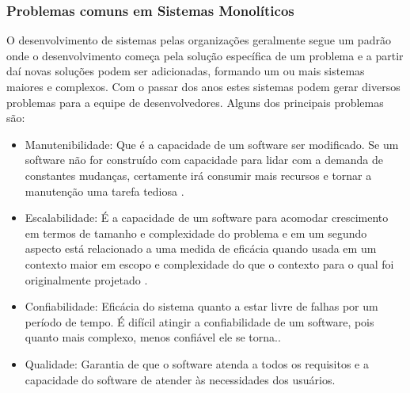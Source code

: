\documentclass[12pt]{article}
\begin{document}
\subsubsection{Problemas comuns em Sistemas Monolíticos} 
O desenvolvimento de sistemas pelas organizações geralmente segue um padrão onde o desenvolvimento começa pela solução específica de um problema e a partir daí novas soluções podem ser adicionadas, formando um ou mais sistemas maiores e complexos. Com o passar dos anos estes sistemas podem gerar diversos problemas para a equipe de desenvolvedores. Alguns dos principais problemas são:
\begin{itemize}
	\item Manutenibilidade: Que é a capacidade de um software ser modificado. Se um software não for construído com capacidade para lidar com a demanda de constantes mudanças, certamente irá consumir mais recursos e tornar a manutenção uma tarefa tediosa \cite{Velmourougan2014}.
	\item Escalabilidade: É a capacidade de um software para acomodar crescimento em termos de tamanho e complexidade do problema e em um segundo aspecto está relacionado a uma medida de eficácia quando usada em um contexto maior em escopo e complexidade do que o contexto para o qual foi originalmente projetado \cite{Ibrahim2009}.
	\item Confiabilidade: Eficácia do sistema quanto a estar livre de falhas por um período de tempo. É difícil atingir a confiabilidade de um software, pois quanto mais complexo, menos confiável ele se torna.\cite{pan1999}.
	\item Qualidade: Garantia de que o software atenda a todos os requisitos e a capacidade do software de atender às necessidades dos usuários.
\end{itemize}

\end{document}

